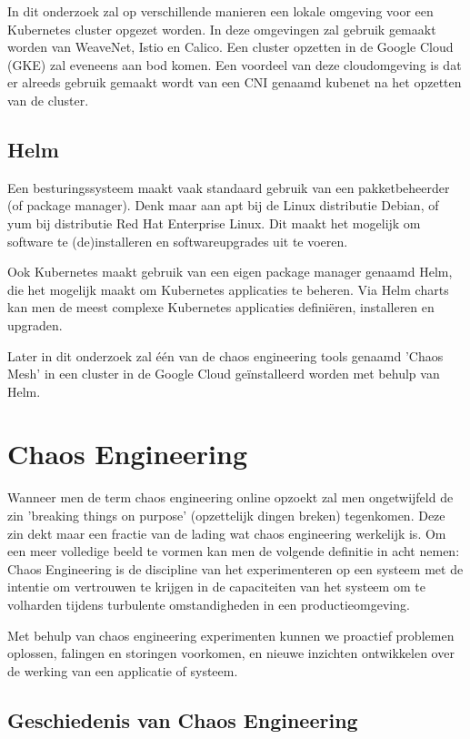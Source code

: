 In dit onderzoek zal op verschillende manieren een lokale omgeving voor een Kubernetes cluster opgezet worden. In deze omgevingen zal gebruik gemaakt worden van WeaveNet, Istio en Calico. Een cluster opzetten in de Google Cloud (GKE) zal eveneens aan bod komen. Een voordeel van deze cloudomgeving is dat er alreeds gebruik gemaakt wordt van een CNI genaamd kubenet na het opzetten van de cluster.    
 
\subsection{Helm}

Een besturingssysteem maakt vaak standaard gebruik van een pakketbeheerder (of package manager). Denk maar aan apt bij de Linux distributie Debian, of yum bij distributie Red Hat Enterprise Linux. Dit maakt het mogelijk om software te (de)installeren en softwareupgrades uit te voeren.

Ook Kubernetes maakt gebruik van een eigen package manager genaamd Helm, die het mogelijk maakt om Kubernetes applicaties te beheren. Via Helm charts kan men de meest complexe Kubernetes applicaties definiëren, installeren en upgraden.

Later in dit onderzoek zal één van de chaos engineering tools genaamd 'Chaos Mesh' in een cluster in de Google Cloud geïnstalleerd worden met behulp van Helm.  

\section{Chaos Engineering}
\label{ch:chaos}

Wanneer men de term chaos engineering online opzoekt zal men ongetwijfeld de zin 'breaking things on purpose' (opzettelijk dingen breken) tegenkomen. Deze zin dekt maar een fractie van de lading wat chaos engineering werkelijk is. Om een meer volledige beeld te vormen kan men de volgende definitie in acht nemen: Chaos Engineering is de discipline van het experimenteren op een systeem met de intentie om vertrouwen te krijgen in de capaciteiten van het systeem om te volharden tijdens turbulente omstandigheden in een productieomgeving. \autocite{Eliot2019}

Met behulp van chaos engineering experimenten kunnen we proactief problemen oplossen, falingen en storingen voorkomen, en nieuwe inzichten ontwikkelen over de werking van een applicatie of systeem.  

\subsection{Geschiedenis van Chaos Engineering}


